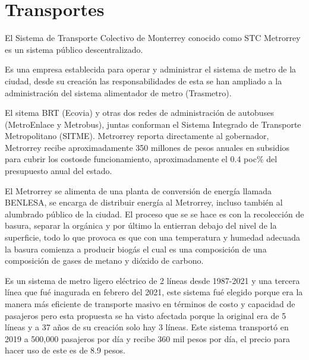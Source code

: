 \documentclass[a4paper]{article}
\begin{document}
\autocite{Poblacion}

\section{Transportes}
El Sistema de Transporte Colectivo de Monterrey conocido como STC Metrorrey es un sistema público descentralizado.

Es una empresa establecida para operar y administrar el sistema de metro de la ciudad, desde su creación  las responsabilidades de esta se han ampliado a la administración del sistema alimentador de metro (Trasmetro).

\autocite{Manchester}

El sitema BRT (Ecovia) y otras dos redes de administración de autobuses (MetroEnlace y Metrobus), juntas conforman el Sistema Integrado de Transporte Metropolitano (SITME).
Metrorrey reporta directamente al gobernador, Metrorrey recibe aproximadamente  350 millones de pesos anuales en subsidios para cubrir los costosde funcionamiento, aproximadamente el 0.4 poc\% del presupuesto anual del estado.

El Metrorrey se alimenta de una planta de conversión de energía llamada BENLESA, se encarga de distribuir energía al Metrorrey, incluso también al alumbrado público de la ciudad. El proceso que se se hace es con la recolección de basura, separar la orgánica y por último la entierran debajo del nivel de la superficie, todo lo que provoca es que con una temperatura y humedad adecuada la basura comienza a producir biogás el cual es una composición de una composición de gases de metano y dióxido de carbono.

\autocite{RN7}
 

Es un sistema de metro ligero eléctrico de 2 líneas desde 1987-2021  y una tercera línea que fué inagurada en febrero del 2021, este sistema fué elegido porque era la manera más eficiente de transporte masivo en términos de costo y capacidad de pasajeros pero esta propuesta se ha visto afectada porque la original era de 5 líneas y a 37 años de su creación solo hay 3 líneas. 
Este sistema transportó en  2019 a 500,000 pasajeros por día y recibe 360 mil pesos por día, el precio para hacer uso de este es de 8.9 pesos.

\autocite{Manchester}
\end{document}
